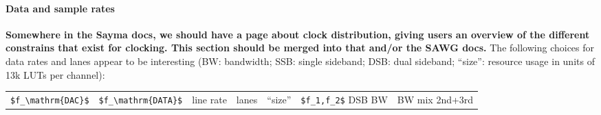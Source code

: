 \paragraph{Data and sample rates}\label{data-and-sample-rates}

\textbf{Somewhere in the Sayma docs, we should have a page about clock
	distribution, giving users an overview of the different constrains that
	exist for clocking. This section should be merged into that and/or the
	SAWG docs.} The following choices for data rates and lanes appear to be
interesting (BW: bandwidth; SSB: single sideband; DSB: dual sideband;
``size'': resource usage in units of 13k LUTs per channel):

\begin{longtable}[]{@{}lllllll@{}}

	\begin{minipage}[b]{0.14\columnwidth}\raggedright\strut
		\texttt{\$f\_\textbackslash{}mathrm\{DAC\}\$}\strut
	\end{minipage} & \begin{minipage}[b]{0.15\columnwidth}\raggedright\strut
	\texttt{\$f\_\textbackslash{}mathrm\{DATA\}\$}\strut
\end{minipage} & \begin{minipage}[b]{0.09\columnwidth}\raggedright\strut
line rate\strut
\end{minipage} & \begin{minipage}[b]{0.06\columnwidth}\raggedright\strut
lanes\strut
\end{minipage} & \begin{minipage}[b]{0.07\columnwidth}\raggedright\strut
``size''\strut
\end{minipage} & \begin{minipage}[b]{0.14\columnwidth}\raggedright\strut
\texttt{\$f\_1,f\_2\$} DSB BW\strut
\end{minipage} & \begin{minipage}[b]{0.14\columnwidth}\raggedright\strut
BW mix 2nd+3rd\strut
\end{minipage}\tabularnewline


\end{longtable}
